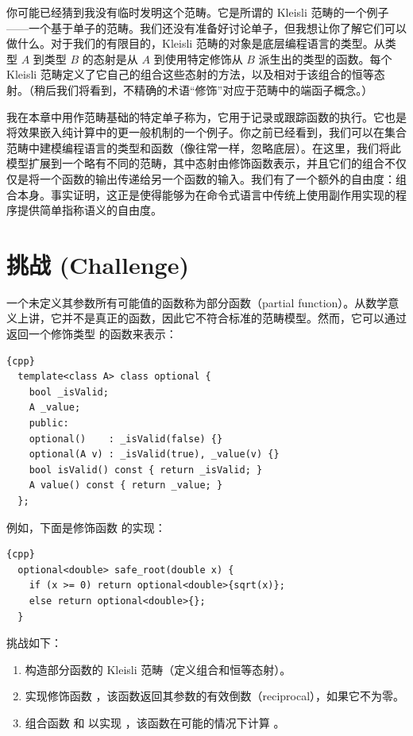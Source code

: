 你可能已经猜到我没有临时发明这个范畴。它是所谓的 Kleisli 范畴的一个例子——一个基于单子的范畴。我们还没有准备好讨论单子，但我想让你了解它们可以做什么。对于我们的有限目的，Kleisli 范畴的对象是底层编程语言的类型。从类型 $A$ 到类型 $B$ 的态射是从 $A$ 到使用特定修饰从 $B$ 派生出的类型的函数。每个 Kleisli 范畴定义了它自己的组合这些态射的方法，以及相对于该组合的恒等态射。（稍后我们将看到，不精确的术语“修饰”对应于范畴中的端函子概念。）

我在本章中用作范畴基础的特定单子称为，它用于记录或跟踪函数的执行。它也是将效果嵌入纯计算中的更一般机制的一个例子。你之前已经看到，我们可以在集合范畴中建模编程语言的类型和函数（像往常一样，忽略底层）。在这里，我们将此模型扩展到一个略有不同的范畴，其中态射由修饰函数表示，并且它们的组合不仅仅是将一个函数的输出传递给另一个函数的输入。我们有了一个额外的自由度：组合本身。事实证明，这正是使得能够为在命令式语言中传统上使用副作用实现的程序提供简单指称语义的自由度。

\section{挑战 (Challenge)}

一个未定义其参数所有可能值的函数称为部分函数（partial function）。从数学意义上讲，它并不是真正的函数，因此它不符合标准的范畴模型。然而，它可以通过返回一个修饰类型  的函数来表示：

\begin{lstlisting}{cpp}
  template<class A> class optional {
    bool _isValid;
    A _value;
    public:
    optional()    : _isValid(false) {}
    optional(A v) : _isValid(true), _value(v) {}
    bool isValid() const { return _isValid; }
    A value() const { return _value; }
  };
\end{lstlisting}
例如，下面是修饰函数  的实现：

\begin{lstlisting}{cpp}
  optional<double> safe_root(double x) {
    if (x >= 0) return optional<double>{sqrt(x)};
    else return optional<double>{};
  }
\end{lstlisting}
挑战如下：

\begin{enumerate}
  \tightlist
  \item
  构造部分函数的 Kleisli 范畴（定义组合和恒等态射）。
  \item
  实现修饰函数 ，该函数返回其参数的有效倒数（reciprocal），如果它不为零。
  \item
  组合函数  和  以实现 ，该函数在可能的情况下计算 。
\end{enumerate}
